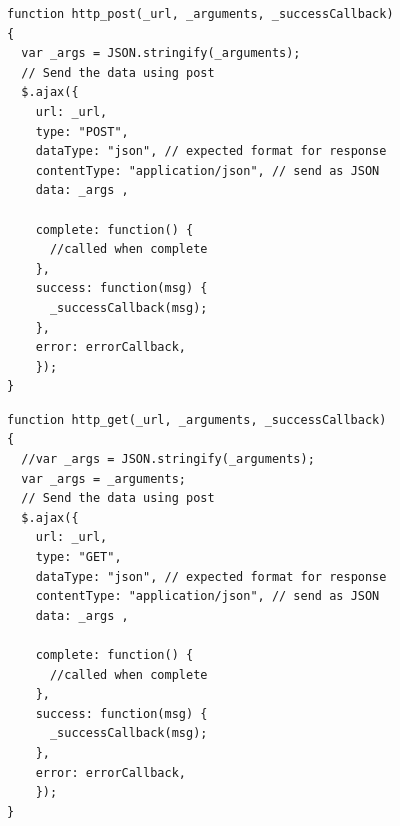 \begin{lstlisting}[label=listing_http_api_post, caption=Fragment kodu pozwalający na użycie zapytań HTTP typu POST]
function http_post(_url, _arguments, _successCallback)
{
  var _args = JSON.stringify(_arguments);
  // Send the data using post
  $.ajax({
    url: _url,
    type: "POST",
    dataType: "json", // expected format for response
    contentType: "application/json", // send as JSON
    data: _args ,

    complete: function() {
      //called when complete
    },
    success: function(msg) {
      _successCallback(msg);
    },
    error: errorCallback,
    });
}
\end{lstlisting}

\clearpage

\begin{lstlisting}[label=listing_http_api_get, caption=Fragment kodu pozwalający na użycie zapytań HTTP typu GET]
function http_get(_url, _arguments, _successCallback)
{
  //var _args = JSON.stringify(_arguments);
  var _args = _arguments;
  // Send the data using post
  $.ajax({
    url: _url,
    type: "GET",
    dataType: "json", // expected format for response
    contentType: "application/json", // send as JSON
    data: _args ,

    complete: function() {
      //called when complete
    },
    success: function(msg) {
      _successCallback(msg);
    },
    error: errorCallback,
    });
}
\end{lstlisting}